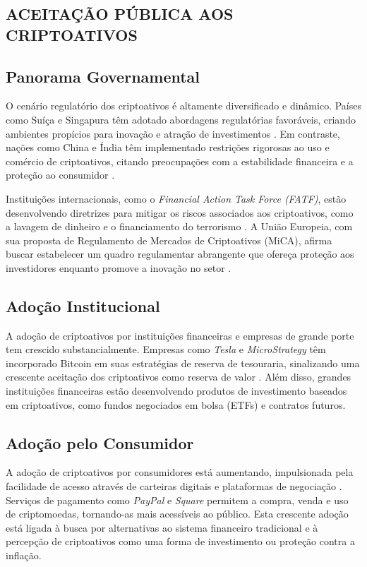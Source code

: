 \documentclass[article,12pt,oneside,a4paper,english,brazil]{unifil}
\begin{document}
\begin{Spacing}{1.5}
\section*{ACEITAÇÃO PÚBLICA AOS CRIPTOATIVOS}

\subsection*{Panorama Governamental} 

O cenário regulatório dos criptoativos é altamente diversificado e dinâmico. Países como Suíça e Singapura têm adotado abordagens regulatórias favoráveis, criando ambientes propícios para inovação e atração de investimentos \cite{zohar2015bitcoin}. Em contraste, nações como China e Índia têm implementado restrições rigorosas ao uso e comércio de criptoativos, citando preocupações com a estabilidade financeira e a proteção ao consumidor \cite{auer2018regulating}.

Instituições internacionais, como o \textit{Financial Action Task Force (FATF)}, estão desenvolvendo diretrizes para mitigar os riscos associados aos criptoativos, como a lavagem de dinheiro e o financiamento do terrorismo \cite{fatf2019guidance}. A União Europeia, com sua proposta de Regulamento de Mercados de Criptoativos (MiCA), afirma buscar estabelecer um quadro regulamentar abrangente que ofereça proteção aos investidores enquanto promove a inovação no setor \cite{european2020proposal}.

\subsection*{Adoção Institucional} 
A adoção de criptoativos por instituições financeiras e empresas de grande porte tem crescido substancialmente. Empresas como \textit{Tesla} e \textit{MicroStrategy} têm incorporado Bitcoin em suas estratégias de reserva de tesouraria, sinalizando uma crescente aceitação dos criptoativos como reserva de valor \cite{bouri2017hedge}. Além disso, grandes instituições financeiras estão desenvolvendo produtos de investimento baseados em criptoativos, como fundos negociados em bolsa (ETFs) e contratos futuros.

\subsection*{Adoção pelo Consumidor} 

A adoção de criptoativos por consumidores está aumentando, impulsionada pela facilidade de acesso através de carteiras digitais e plataformas de negociação \cite{kondor2014do}. Serviços de pagamento como \textit{PayPal} e \textit{Square} permitem a compra, venda e uso de criptomoedas, tornando-as mais acessíveis ao público. Esta crescente adoção está ligada à busca por alternativas ao sistema financeiro tradicional e à percepção de criptoativos como uma forma de investimento ou proteção contra a inflação.


\end{Spacing}
\end{document}
